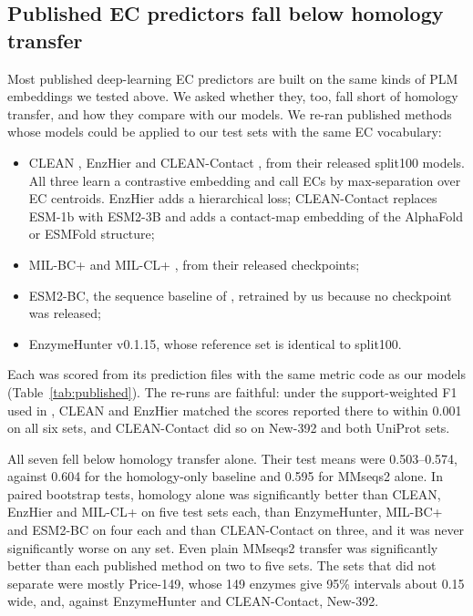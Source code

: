 \documentclass[11pt]{article}
\begin{document}
\subsection{Published EC predictors fall below homology transfer}
\label{sec:published}

Most published deep-learning EC predictors are built on the same kinds of PLM embeddings we tested above. We asked
whether they, too, fall short of homology transfer, and how they compare with our models. We re-ran published methods
whose models could be applied to our test sets with the same EC vocabulary:
\begin{itemize}
  \item CLEAN \cite{clean}, EnzHier \cite{enzhier} and CLEAN-Contact \cite{cleancontact}, from their released split100
        models. All three learn a contrastive embedding and call ECs by max-separation over EC centroids. EnzHier adds a
        hierarchical loss; CLEAN-Contact replaces ESM-1b with ESM2-3B and adds a contact-map embedding of the
        AlphaFold or ESMFold structure;
  \item MIL-BC+ and MIL-CL+ \cite{milbc}, from their released checkpoints;
  \item ESM2-BC, the sequence baseline of \cite{milbc}, retrained by us because no checkpoint was released;
  \item EnzymeHunter \cite{enzymehunter} v0.1.15, whose reference set is identical to split100.
\end{itemize}
Each was scored from its prediction files with the same metric code as our models (Table~\ref{tab:published}). The
re-runs are faithful: under the support-weighted F1 used in \cite{milbc}, CLEAN and EnzHier matched the scores
reported there to within 0.001 on all six sets, and CLEAN-Contact did so on New-392 and both UniProt sets.

All seven fell below homology transfer alone. Their test means were 0.503--0.574, against 0.604 for the homology-only
baseline and 0.595 for MMseqs2 alone. In paired bootstrap tests, homology alone was significantly better than CLEAN,
EnzHier and MIL-CL+ on five test sets each, than EnzymeHunter, MIL-BC+ and ESM2-BC on four each and than
CLEAN-Contact on three, and it was never significantly worse on any set. Even plain MMseqs2 transfer was significantly
better than each published method on two to five sets. The sets that did not separate were mostly Price-149, whose 149
enzymes give 95\% intervals about 0.15 wide, and, against EnzymeHunter and CLEAN-Contact, New-392.
\end{document}
